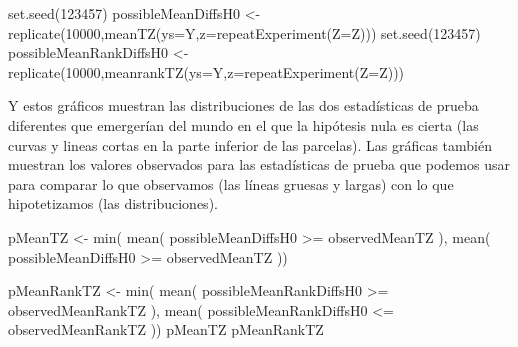 \documentclass[
]{article}
\newenvironment{Shaded}{\begin{snugshade}}{\end{snugshade}}
\newcommand{\AttributeTok}[1]{\textcolor[rgb]{0.77,0.63,0.00}{#1}}
\newcommand{\DecValTok}[1]{\textcolor[rgb]{0.00,0.00,0.81}{#1}}
\newcommand{\FunctionTok}[1]{\textcolor[rgb]{0.00,0.00,0.00}{#1}}
\newcommand{\NormalTok}[1]{#1}
\newcommand{\OtherTok}[1]{\textcolor[rgb]{0.56,0.35,0.01}{#1}}
\newcommand{\SpecialCharTok}[1]{\textcolor[rgb]{0.00,0.00,0.00}{#1}}
\begin{document}
\begin{Shaded}
\begin{Highlighting}[]
\FunctionTok{set.seed}\NormalTok{(}\DecValTok{123457}\NormalTok{)}
\NormalTok{possibleMeanDiffsH0 }\OtherTok{\textless{}{-}} \FunctionTok{replicate}\NormalTok{(}\DecValTok{10000}\NormalTok{,}\FunctionTok{meanTZ}\NormalTok{(}\AttributeTok{ys=}\NormalTok{Y,}\AttributeTok{z=}\FunctionTok{repeatExperiment}\NormalTok{(}\AttributeTok{Z=}\NormalTok{Z)))}
\FunctionTok{set.seed}\NormalTok{(}\DecValTok{123457}\NormalTok{)}
\NormalTok{possibleMeanRankDiffsH0 }\OtherTok{\textless{}{-}} \FunctionTok{replicate}\NormalTok{(}\DecValTok{10000}\NormalTok{,}\FunctionTok{meanrankTZ}\NormalTok{(}\AttributeTok{ys=}\NormalTok{Y,}\AttributeTok{z=}\FunctionTok{repeatExperiment}\NormalTok{(}\AttributeTok{Z=}\NormalTok{Z)))}
\end{Highlighting}
\end{Shaded}

Y estos gráficos muestran las distribuciones de las dos estadísticas de prueba diferentes que emergerían del mundo en el que la hipótesis nula es cierta (las curvas y lineas cortas en la parte inferior de las parcelas). Las gráficas también muestran los valores observados para las estadísticas de prueba que podemos usar para comparar lo que observamos (las líneas gruesas y largas) con lo que hipotetizamos (las distribuciones).

\begin{Shaded}
\begin{Highlighting}[]
\NormalTok{pMeanTZ }\OtherTok{\textless{}{-}} \FunctionTok{min}\NormalTok{( }\FunctionTok{mean}\NormalTok{( possibleMeanDiffsH0 }\SpecialCharTok{\textgreater{}=}\NormalTok{ observedMeanTZ ),}
           \FunctionTok{mean}\NormalTok{( possibleMeanDiffsH0 }\SpecialCharTok{\textgreater{}=}\NormalTok{ observedMeanTZ ))}

\NormalTok{pMeanRankTZ }\OtherTok{\textless{}{-}} \FunctionTok{min}\NormalTok{( }\FunctionTok{mean}\NormalTok{( possibleMeanRankDiffsH0 }\SpecialCharTok{\textgreater{}=}\NormalTok{ observedMeanRankTZ ),}
            \FunctionTok{mean}\NormalTok{( possibleMeanRankDiffsH0 }\SpecialCharTok{\textless{}=}\NormalTok{ observedMeanRankTZ ))}
\NormalTok{pMeanTZ}
\NormalTok{pMeanRankTZ}
\end{Highlighting}
\end{Shaded}
\end{document}

